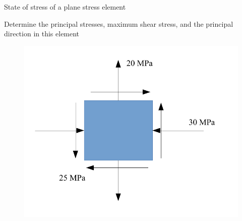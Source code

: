 \documentclass[
10pt,
a4paper,
openany,
svgnames,
]{kaobook} %
\begin{document}
\begin{example} State of stress of a plane stress element \label{example: plane stress}
  
  Determine the principal stresses, maximum shear stress, and the principal direction in this element 

  \begin{figure}[H]
    \centering
    \includegraphics[scale=0.5]{pictures/Static-body-load-analysis/plane-stress-example}
    \caption{}
  \end{figure}
\end{example}
\end{document}
